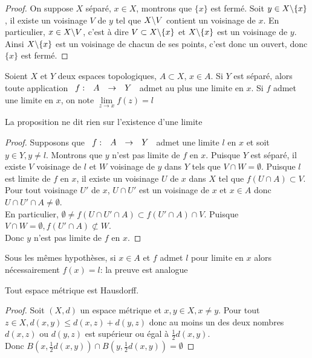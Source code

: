\documentclass[]{report}
\begin{document}
    \begin{proof}{}{}
        On suppose $X$ séparé, $x\in X$, montrons que $\{x\}$ est fermé. Soit $y\in X\backslash\{x\}$, il existe un voisinage $V$ de $y$ tel que $X\backslash V$ contient un voisinage de $x$. En particulier, $x\in X\backslash V$, c'est à dire $V\subset X\backslash \{x\}$ et $X\backslash \{x\}$ est un voisinage de $y$. Ainsi $X\backslash \{x\}$ est un voisinage de chacun de ses points, c'est donc un ouvert, donc $\{x\}$ est fermé.
    \end{proof}

    \begin{prop}{}{}
        Soient $X$ et $Y$ deux espaces topologiques, $A\subset X$, $x\in A$. Si $Y$ est séparé, alors toute application $\begin{array}{ccccc} f : & A & \to & Y \end{array}$ admet au plus une limite en $x$. Si $f$ admet une limite en $x$, on note $\underset{z\to x}{\lim} f(z)=l$
    \end{prop}

    \begin{re}{}{}
        La proposition ne dit rien sur l'existence d'une limite
    \end{re}

    \begin{proof}{}{}
        Supposons que $\begin{array}{ccccc} f : & A & \to & Y \end{array}$ admet une limite $l$ en $x$ et soit $y\in Y,y\neq l$. Montrons que $y$ n'est pas limite de $f$ en $x$. Puisque $Y$ est séparé, il existe $V$ voisinage de $l$ et $W$ voisinage de $y$ dans $Y$ tels que $V\cap W=\emptyset$. Puisque $l$ est limite de $f$ en $x$, il existe un voisinage $U$ de $x$ dans $X$ tel que $f(U\cap A)\subset V$. Pour tout voisinage $U'$ de $x$, $U\cap U'$ est un voisinage de $x$ et $x\in A$ donc $U\cap U'\cap A\neq \emptyset$.\\
        En particulier, $\emptyset\neq f(U\cap U'\cap A)\subset f(U'\cap A)\cap V$. Puisque $V\cap W=\emptyset, f(U'\cap A)\not\subset W$.\\
        Donc $y$ n'est pas limite de $f$ en $x$.
    \end{proof}

    \begin{re}{}{}
        Sous les mêmes hypothèses, si $x\in A$ et $f$ admet $l$ pour limite en $x$ alors nécessairement $f(x)=l$: la preuve est analogue
    \end{re}

    \begin{prop}{}{}
        Tout espace métrique est Hausdorff.
    \end{prop}

    \begin{proof}{}{}
        Soit $(X,d)$ un espace métrique et $x,y\in X,x\neq y$. Pour tout $z\in X,d(x,y)\le d(x,z)+d(y,z)$ donc au moins un des deux nombres $d(x,z)$ ou $d(y,z)$ est supérieur ou égal à $\frac{1}{2}d(x,y)$.\\
        Donc $B(x,\frac{1}{2}d(x,y))\cap B(y,\frac{1}{2}d(x,y))=\emptyset$
    \end{proof}
\end{document}
